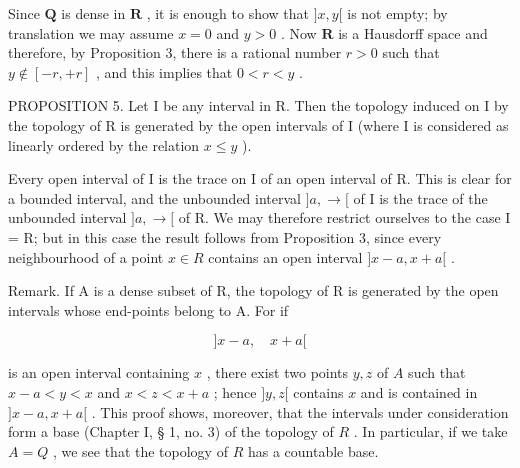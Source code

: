 Since \(\mathbf{Q}\) is dense in \(\mathbf{R}\) , it is enough to show that \(]x, y[\) is not empty; by translation we may assume \(x = 0\) and \(y > 0\) . Now \(\mathbf{R}\) is a Hausdorff space and therefore, by Proposition 3, there is a rational number \(r > 0\) such that \(y \notin [-r, +r]\) , and this implies that \(0 < r < y\) .

PROPOSITION 5. Let I be any interval in R. Then the topology induced on I by the topology of R is generated by the open intervals of I (where I is considered as linearly ordered by the relation \(x \leqslant y\) ).

Every open interval of I is the trace on I of an open interval of R. This is clear for a bounded interval, and the unbounded interval \(]a, \rightarrow[\) of I is the trace of the unbounded interval \(]a, \rightarrow[\) of R. We may therefore restrict ourselves to the case I = R; but in this case the result follows from Proposition 3, since every neighbourhood of a point \(x \in R\) contains an open interval \(]x - a, x + a[\) .

Remark. If A is a dense subset of R, the topology of R is generated by the open intervals whose end-points belong to A. For if

\[
] x - a, \quad x + a [
\]

is an open interval containing \(x\) , there exist two points \(y, z\) of \(A\) such that \(x - a < y < x\) and \(x < z < x + a\) ; hence \(]y, z[\) contains \(x\) and is contained in \(]x - a, x + a[\) . This proof shows, moreover, that the intervals under consideration form a base (Chapter I, § 1, no. 3) of the topology of \(R\) . In particular, if we take \(A = Q\) , we see that the topology of \(R\) has a countable base.

